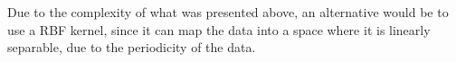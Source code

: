 \documentclass[12pt,a4paper,oneside]{paper}
\begin{document}
Due to the complexity of what was presented above, an alternative would be to use a RBF kernel, since it can
map the data into a space where it is linearly separable, due to the periodicity of the data.


\clearpage

\appendix


\newpage
\printbibliography
\end{document}
